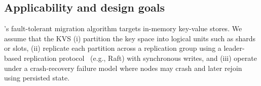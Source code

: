 \subsection{Applicability and design goals}
\label{sec:applicability}




\OurImplementation{}'s fault-tolerant migration algorithm targets in-memory key-value stores. 
We assume that the KVS (i) partition the key space into logical units such as shards or slots, (ii) replicate each partition across a replication group using a leader-based replication protocol~\cite{raft,paxos-simple,chain-replication} (e.g., Raft) with synchronous writes, and (iii) operate under a crash-recovery failure model where nodes may crash and later rejoin using persisted state. 

